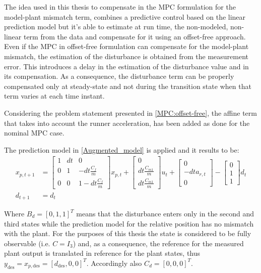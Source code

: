 \documentclass[a4paper,12pt,oneside]{book}
\begin{document}
The idea used in this thesis to compensate in the MPC formulation for the model-plant mismatch term, combines a predictive control based on the linear prediction model but it's able to estimate at run time, the non-modeled, non-linear term from the data and compensate for it using an offset-free approach.
Even if the MPC in offset-free formulation can compensate for the model-plant mismatch, the estimation of the disturbance is obtained from the measurement error. 
This introduces a delay in the estimation of the disturbance value and in its compensation.
As a consequence, the disturbance term can be properly compensated only at steady-state and not during the transition state when that term varies at each time instant. 

\bigskip
Considering the problem statement presented in \ref{MPC:offset-free}, the affine term that takes into account the runner acceleration, has been added as done for the nominal MPC case.

\bigskip
The prediction model in \ref{Augmented_model} is applied and it results to be:
\begin{equation}
\begin{aligned}
	x_{p,t+1} & =
    \begin{bmatrix}
        1 & dt & 0 \\
        0 & 1 & -dt\frac{C_f}{m} \\
        0 & 0 & 1-dt\frac{C_f}{m}
    \end{bmatrix}
    x_{p,t}
    +
    \begin{bmatrix}
        0 \\
        dt \frac{C_{m1}}{m} \\
        dt \frac{C_{m1}}{m}
    \end{bmatrix}
    u_t + 
    \begin{bmatrix}
    0 \\
    - dt a_{r,t} \\
    0
    \end{bmatrix} 
    -
    \begin{bmatrix}
    0 \\
    1 \\
    1
    \end{bmatrix}
	d_t \\
    d_{t+1} & = d_t
\end{aligned}
\label{Offset-free_prediction_model_MPC}
\end{equation}

Where $B_d = [0, 1, 1]^T$ means that the disturbance enters only in the second and third states while the prediction model for the relative position has no mismatch with the plant. 
For the purposes of this thesis the state is considered to be fully observable (i.e. $C = I_3$) and, as a consequence, the reference for the measured plant output is translated in reference for the plant states, thus $y_{\text{des}} = x_{p,\text{des}} = [d_{\text{des}}, 0, 0] ^T$.
Accordingly also $C_d = [0, 0, 0]^T$. 
\end{document}
